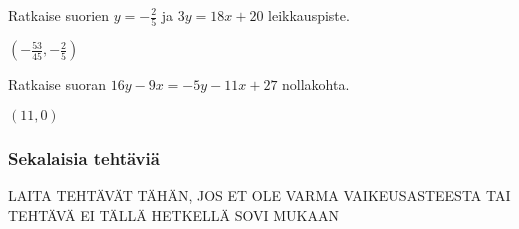 \begin{tehtavasivu}
\begin{tehtava}
Ratkaise suorien $y=-\frac{2}{5}$ ja $3y=18x+20$ leikkauspiste.
\begin{vastaus}
$(-\frac{53}{45}, -\frac{2}{5})$
\end{vastaus}
\end{tehtava}

\begin{tehtava}
Ratkaise suoran $16y-9x=-5y-11x+27$ nollakohta.
\begin{vastaus}
$(11, 0)$
\end{vastaus}
\end{tehtava}

\subsubsection*{Sekalaisia tehtäviä}

LAITA TEHTÄVÄT TÄHÄN, JOS ET OLE VARMA VAIKEUSASTEESTA TAI TEHTÄVÄ
EI TÄLLÄ HETKELLÄ SOVI MUKAAN

\end{tehtavasivu}
